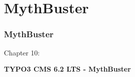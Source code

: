 %

\section{MythBuster}
\begin{frame}[fragile]
	\frametitle{MythBuster}

	\begin{center}\huge{Chapter 10:}\end{center}
	\begin{center}\huge{\color{typo3darkgrey}\textbf{TYPO3 CMS 6.2 LTS - MythBuster}}\end{center}

\end{frame}



